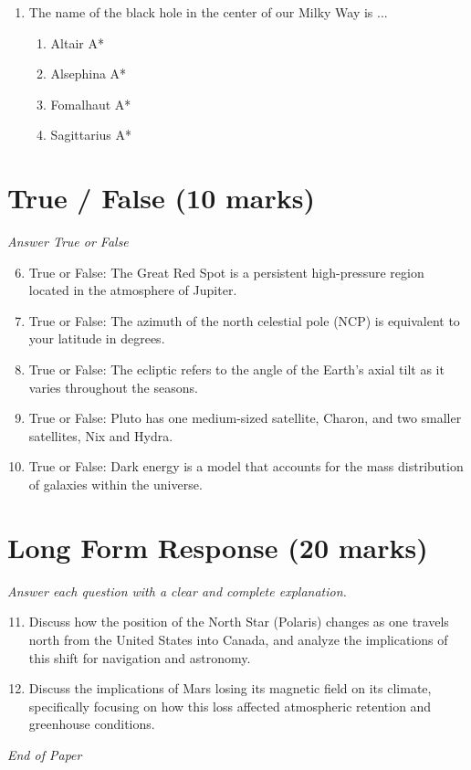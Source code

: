 \documentclass[12pt]{article}
\begin{document}
\begin{enumerate}[label=\arabic*.]
\begin{enumerate}[label=(\alph*)]
    \item hydrogen compounds (H 2 O CH 4 NH 3) light gases (H He) metals rocks
    \item hydrogen compounds (H 2 O CH 4 NH 3) light gases (H He) rocks metals
    \item light gases (H He) hydrogen compounds (H 2 O CH 4 NH 3) metals rocks
    \item light gases (H He) hydrogen compounds (H 2 O CH 4 NH 3) rocks metals
\end{enumerate}
\item The name of the black hole in the center of our Milky Way is ...
\begin{enumerate}[label=(\alph*)]
    \item Altair A*
    \item Alsephina A*
    \item Fomalhaut A*
    \item Sagittarius A*
\end{enumerate}
\end{enumerate}

\section*{True / False (10 marks)}
\textit{Answer True or False}
\begin{enumerate}[label=\arabic*.]
\setcounter{enumi}{5}
\item True or False: The Great Red Spot is a persistent high-pressure region located in the atmosphere of Jupiter.
\item True or False: The azimuth of the north celestial pole (NCP) is equivalent to your latitude in degrees.
\item True or False: The ecliptic refers to the angle of the Earth's axial tilt as it varies throughout the seasons.
\item True or False: Pluto has one medium-sized satellite, Charon, and two smaller satellites, Nix and Hydra.
\item True or False: Dark energy is a model that accounts for the mass distribution of galaxies within the universe.
\end{enumerate}

\section*{Long Form Response (20 marks)}
\textit{Answer each question with a clear and complete explanation.}
\begin{enumerate}[label=\arabic*.]
\setcounter{enumi}{10}
\item Discuss how the position of the North Star (Polaris) changes as one travels north from the United States into Canada, and analyze the implications of this shift for navigation and astronomy.
\item Discuss the implications of Mars losing its magnetic field on its climate, specifically focusing on how this loss affected atmospheric retention and greenhouse conditions.
\end{enumerate}

\vfill
\noindent\textit{End of Paper}
\end{document}
